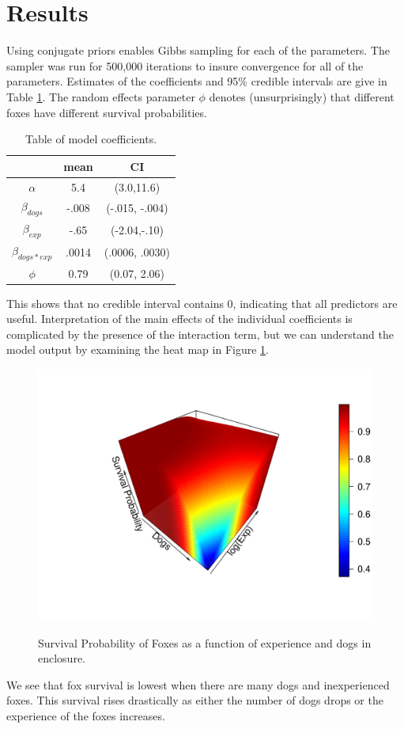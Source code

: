 \documentclass[aoas,preprint]{imsart}
\numberwithin{equation}{section}
\theoremstyle{plain}
\begin{document}
\section{Results}
Using conjugate priors enables Gibbs sampling for each of the parameters. The sampler was run for 500,000 iterations to insure convergence for all of the parameters. Estimates of the coefficients and 95\% credible intervals are give in Table \ref{tab:PostEst}. The random effects parameter $\phi$ denotes (unsurprisingly) that different foxes have different survival probabilities.
\begin{table}[h!]
	\begin{center}
		\begin{tabular}{|c|c|c|}
			\hline
			& mean & CI \\
			\hline
			$\alpha$ & 5.4 & (3.0,11.6) \\
			$\beta_{dogs}$ & -.008 & (-.015, -.004) \\
			$\beta_{exp}$ & -.65 & (-2.04,-.10) \\
			$\beta_{dogs*exp}$ & .0014 & (.0006, .0030)\\
			$ \phi$ & 0.79 & (0.07, 2.06) \\
			\hline
		\end{tabular}
		\label{tab:PostEst}
	\end{center}
	\caption{Table of model coefficients.}
\end{table}
 This shows that no credible interval contains 0, indicating that all predictors are useful. Interpretation of the main effects of the individual coefficients is complicated by the presence of the interaction term, but we can understand the model output by examining the heat map in Figure \ref{fig:SurvProb2}. 
\begin{figure}[h!]
\begin{center}
\caption{Survival Probability of Foxes as a function of experience and dogs in enclosure.}
\includegraphics[width=1\textwidth]{survivalprob.pdf}
\label{fig:SurvProb2}
\end{center}
\end{figure}
We see that fox survival is lowest when there are many dogs and inexperienced foxes. This survival rises drastically as either the number of dogs drops or the experience of the foxes increases.
\end{document}
